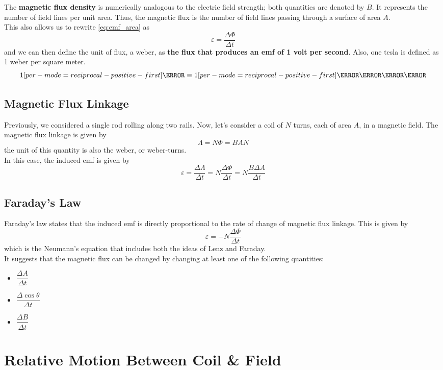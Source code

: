 \documentclass[a4paper,12pt]{article}
\let\oldsection\section
\renewcommand\section{\clearpage\oldsection}
\let\oldsi\si
\renewcommand{\si}[1]{\oldsi[per-mode=reciprocal-positive-first]{#1}}
\newcommand{\lb}{\\[8pt]}
\begin{document}
The \textbf{magnetic flux density} is numerically analogous to the electric field strength; both quantities are denoted by $B$. It represents the number of field lines per unit area. Thus, the magnetic flux is the number of field lines passing through a surface of area $A$.\lb
This also allows us to rewrite \cref{eq:emf_area} as $$\varepsilon = \frac{\Delta \Phi}{\Delta t}$$
and we can then define the unit of flux, a weber, as \textbf{the flux that produces an emf of 1 volt per second}.
Also, one tesla is defined as 1 weber per square meter.
$$1\si{\tesla}\equiv 1\si{\weber\per\m\squared}$$

\pagebreak

\subsection{Magnetic Flux Linkage}

Previously, we considered a single rod rolling along two rails. Now, let's consider a coil of $N$ turns, each of area $A$, in a magnetic field. The magnetic flux linkage is given by $$\Lambda = N\Phi = BAN$$
the unit of this quantity is also the weber, or weber-turns.\lb
In this case, the induced emf is given by $$\varepsilon = \frac{\Delta \Lambda}{\Delta t} = N\frac{\Delta \Phi}{\Delta t} = N\frac{B\Delta A}{\Delta t}$$

\subsection{Faraday's Law}

Faraday's law states that the induced emf is directly proportional to the rate of change of magnetic flux linkage. This is given by $$\varepsilon = -N\frac{\Delta \Phi}{\Delta t}$$
which is the Neumann's equation that includes both the ideas of Lenz and Faraday.\lb
It suggests that the magnetic flux can be changed by changing at least one of the following quantities:
\begin{itemize}
  \item $\dfrac{\Delta A}{\Delta t}$
  \item $\dfrac{\Delta \cos \theta}{\Delta t}$
  \item $\dfrac{\Delta B}{\Delta t}$
\end{itemize}

\section{Relative Motion Between Coil \& Field}
\end{document}
